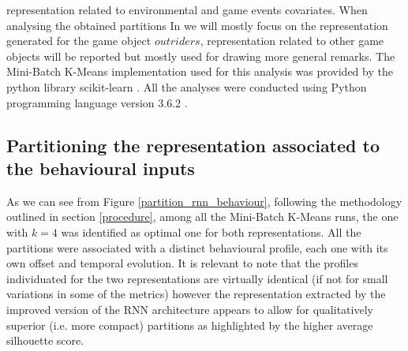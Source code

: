 representation related to environmental and game events covariates. When analysing the obtained partitions In we will mostly focus on the representation generated for the game object $outriders$, representation related to other game objects will be reported but mostly used for drawing more general remarks. The Mini-Batch K-Means implementation used for this analysis was provided by the python library scikit-learn \cite{scikit-learn}. All the analyses were conducted using Python programming language version 3.6.2 \cite{10.5555/1593511}.

\subsection{Partitioning the representation associated to the behavioural inputs}
\label{partition_behaviour}
As we can see from Figure \ref{partition_rnn_behaviour}, following the methodology outlined in section \ref{procedure}, among all the Mini-Batch K-Means runs, the one with $k=4$ was identified as optimal one for both representations. All the partitions were associated with a distinct behavioural profile, each one with its own offset and temporal evolution. It is relevant to note that the profiles individuated for the two representations are virtually identical (if not for small variations in some of the metrics) however the representation extracted by the improved version of the RNN architecture appears to allow for qualitatively superior (i.e. more compact) partitions as highlighted by the higher average silhouette score.
